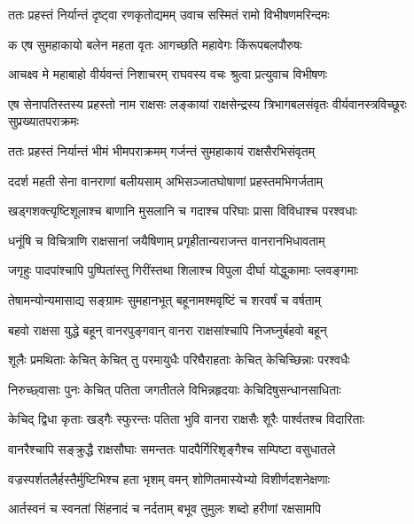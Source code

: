 
\twolineshloka
{ततः प्रहस्तं निर्यान्तं दृष्ट्वा रणकृतोद्यमम्}
{उवाच सस्मितं रामो विभीषणमरिन्दमः} %

\twolineshloka
{क एष सुमहाकायो बलेन महता वृतः}
{आगच्छति महावेगः किंरूपबलपौरुषः} %

\twolineshloka
{आचक्ष्व मे महाबाहो वीर्यवन्तं निशाचरम्}
{राघवस्य वचः श्रुत्वा प्रत्युवाच विभीषणः} %

\threelineshloka
{एष सेनापतिस्तस्य प्रहस्तो नाम राक्षसः}
{लङ्कायां राक्षसेन्द्रस्य त्रिभागबलसंवृतः}
{वीर्यवानस्त्रविच्छूरः सुप्रख्यातपराक्रमः} %

\twolineshloka
{ततः प्रहस्तं निर्यान्तं भीमं भीमपराक्रमम्}
{गर्जन्तं सुमहाकायं राक्षसैरभिसंवृतम्} %

\twolineshloka
{ददर्श महती सेना वानराणां बलीयसाम्}
{अभिसञ्जातघोषाणां प्रहस्तमभिगर्जताम्} %

\twolineshloka
{खड्गशक्त्यृष्टिशूलाश्च बाणानि मुसलानि च}
{गदाश्च परिघाः प्रासा विविधाश्च परश्वधाः} %

\twolineshloka
{धनूंषि च विचित्राणि राक्षसानां जयैषिणाम्}
{प्रगृहीतान्यराजन्त वानरानभिधावताम्} %

\twolineshloka
{जगृहुः पादपांश्चापि पुष्पितांस्तु गिरींस्तथा}
{शिलाश्च विपुला दीर्घा योद्धुकामाः प्लवङ्गमाः} %

\twolineshloka
{तेषामन्योन्यमासाद्य सङ्ग्रामः सुमहानभूत्}
{बहूनामश्मवृष्टिं च शरवर्षं च वर्षताम्} %

\twolineshloka
{बहवो राक्षसा युद्धे बहून् वानरपुङ्गवान्}
{वानरा राक्षसांश्चापि निजघ्नुर्बहवो बहून्} %

\twolineshloka
{शूलैः प्रमथिताः केचित् केचित् तु परमायुधैः}
{परिघैराहताः केचित् केचिच्छिन्नाः परश्वधैः} %

\twolineshloka
{निरुच्छ्वासाः पुनः केचित् पतिता जगतीतले}
{विभिन्नहृदयाः केचिदिषुसन्धानसाधिताः} %

\twolineshloka
{केचिद् द्विधा कृताः खड्गैः स्फुरन्तः पतिता भुवि}
{वानरा राक्षसैः शूरैः पार्श्वतश्च विदारिताः} %

\twolineshloka
{वानरैश्चापि सङ्क्रुद्धै राक्षसौघाः समन्ततः}
{पादपैर्गिरिशृङ्गैश्च सम्पिष्टा वसुधातले} %

\twolineshloka
{वज्रस्पर्शतलैर्हस्तैर्मुष्टिभिश्च हता भृशम्}
{वमन् शोणितमास्येभ्यो विशीर्णदशनेक्षणाः} %

\twolineshloka
{आर्तस्वनं च स्वनतां सिंहनादं च नर्दताम्}
{बभूव तुमुलः शब्दो हरीणां रक्षसामपि} %

